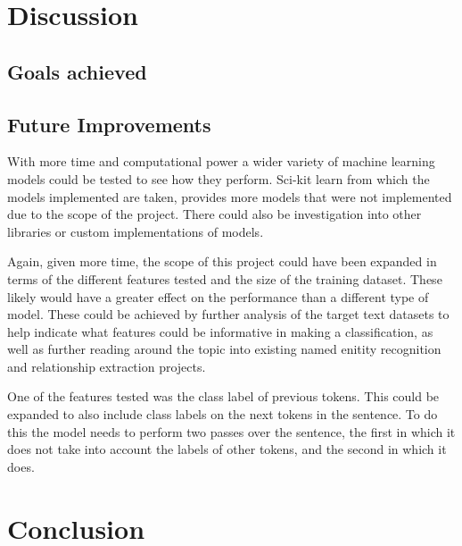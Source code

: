 \documentclass[11pt,oneside]{book}
\begin{document}
\chapter{Discussion}

\section{Goals achieved}


\section{Future Improvements}
With more time and computational power a wider variety of machine learning models could be tested to see how they perform. Sci-kit learn from which the models implemented are taken, provides more models that were not implemented due to the scope of the project. There could also be investigation into other libraries or custom implementations of models.

Again, given more time, the scope of this project could have been expanded in terms of the different features tested and the size of the training dataset. These likely would have a greater effect on the performance than a different type of model. These could be achieved by further analysis of the target text datasets to help indicate what features could be informative in making a classification, as well as further reading around the topic into existing named enitity recognition and relationship extraction projects.

One of the features tested was the class label of previous tokens. This could be expanded to also include class labels on the next tokens in the sentence. To do this the model needs to perform two passes over the sentence, the first in which it does not take into account the labels of other tokens, and the second in which it does.

\chapter{Conclusion}



 
 



\begin{appendices}

\end{appendices}
\end{document}
